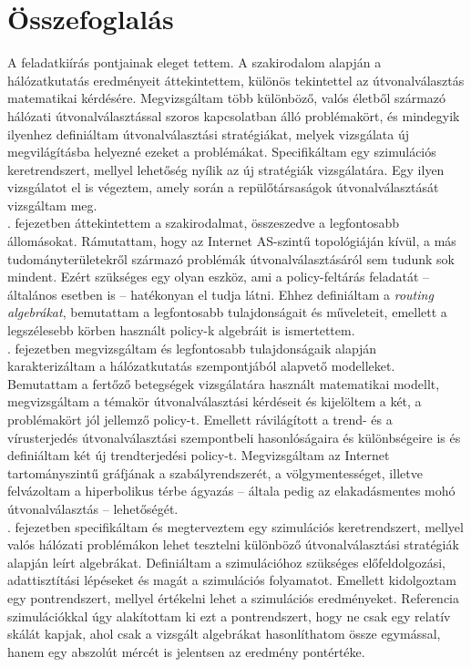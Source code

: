 \chapter{Összefoglalás}\label{summary}
A feladatkiírás pontjainak eleget tettem. A szakirodalom alapján a hálózatkutatás eredményeit áttekintettem, különös tekintettel az útvonalválasztás matematikai kérdésére. Megvizsgáltam több különböző, valós életből származó hálózati útvonalválasztással szoros kapcsolatban álló problémakört, és mindegyik ilyenhez definiáltam útvonalválasztási stratégiákat, melyek vizsgálata új megvilágításba helyezné ezeket a problémákat. Specifikáltam egy szimulációs keretrendszert, mellyel lehetőség nyílik az új stratégiák vizsgálatára. Egy ilyen vizsgálatot el is végeztem, amely során a repülőtársaságok útvonalválasztását vizsgáltam meg.\\

. fejezetben áttekintettem a szakirodalmat, összeszedve a legfontosabb állomásokat. Rámutattam, hogy az Internet AS-szintű topológiáján kívül, a más tudományterületekről származó problémák útvonalválasztásáról sem tudunk sok mindent. Ezért szükséges egy olyan eszköz, ami a policy-feltárás feladatát -- általános esetben is -- hatékonyan el tudja látni. Ehhez definiáltam a \textit{routing algebrákat}, bemutattam a legfontosabb tulajdonságait és műveleteit, emellett a legszélesebb körben használt policy-k algebráit is ismertettem.\\

. fejezetben megvizsgáltam és legfontosabb tulajdonságaik alapján karakterizáltam a hálózatkutatás szempontjából alapvető modelleket. Bemutattam a fertőző betegségek vizsgálatára használt matematikai modellt, megvizsgáltam a témakör útvonalválasztási kérdéseit és kijelöltem a két, a problémakört jól jellemző policy-t. Emellett rávilágított a trend- és a vírusterjedés útvonalválasztási szempontbeli hasonlóságaira és különbségeire is és definiáltam két új trendterjedési policy-t. Megvizsgáltam az Internet tartományszintű gráfjának a szabályrendszerét, a völgymentességet, illetve felvázoltam a hiperbolikus térbe ágyazás -- általa pedig az elakadásmentes mohó útvonalválasztás -- lehetőségét.\\

. fejezetben specifikáltam és megterveztem egy szimulációs keretrendszert, mellyel valós hálózati problémákon lehet tesztelni különböző útvonalválasztási stratégiák alapján leírt algebrákat. Definiáltam a szimulációhoz szükséges előfeldolgozási, adattisztítási lépéseket és magát a szimulációs folyamatot. Emellett kidolgoztam egy pontrendszert, mellyel értékelni lehet a szimulációs eredményeket. Referencia szimulációkkal úgy alakítottam ki ezt a pontrendszert, hogy ne csak egy relatív skálát kapjak, ahol csak a vizsgált algebrákat hasonlíthatom össze egymással, hanem egy abszolút mércét is jelentsen az eredmény pontértéke.\\

